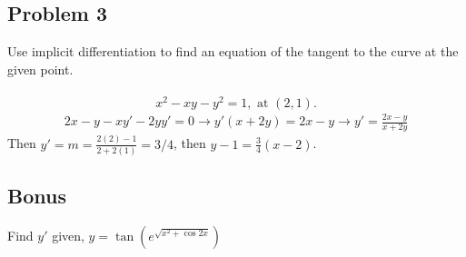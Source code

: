 \documentclass[10pt]{book}
\theoremstyle{definition}
\begin{document}
\subsection*{Problem 3} Use implicit differentiation to find an equation of the tangent to the curve at the given point.\\ \\
\[
x^2-xy-y^2=1,\textrm{ at $(2,1)$.}
\]
\begin{align*}
    2x-y-xy'-2yy'=0\longrightarrow y'(x+2y)=2x-y\longrightarrow y'=\frac{2x-y}{x+2y}
\end{align*}
Then $y'=m=\frac{2(2)-1}{2+2(1)}=3/4$, then $y-1=\frac{3}{4}(x-2)$.
\subsection*{Bonus} Find $y'$ given, $\displaystyle y = \tan\left(e^{\sqrt{x^2+\cos 2x}}\right)$
\end{document}
